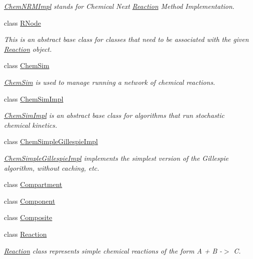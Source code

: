 \begin{DoxyCompactItemize}
\begin{DoxyCompactList}\small\item\em \hyperlink{classchem_1_1ChemNRMImpl}{Chem\-N\-R\-M\-Impl} stands for Chemical Next \hyperlink{classchem_1_1Reaction}{Reaction} Method Implementation. \end{DoxyCompactList}\item 
class \hyperlink{classchem_1_1RNode}{R\-Node}
\begin{DoxyCompactList}\small\item\em This is an abstract base class for classes that need to be associated with the given \hyperlink{classchem_1_1Reaction}{Reaction} object. \end{DoxyCompactList}\item 
class \hyperlink{classchem_1_1ChemSim}{Chem\-Sim}
\begin{DoxyCompactList}\small\item\em \hyperlink{classchem_1_1ChemSim}{Chem\-Sim} is used to manage running a network of chemical reactions. \end{DoxyCompactList}\item 
class \hyperlink{classchem_1_1ChemSimImpl}{Chem\-Sim\-Impl}
\begin{DoxyCompactList}\small\item\em \hyperlink{classchem_1_1ChemSimImpl}{Chem\-Sim\-Impl} is an abstract base class for algorithms that run stochastic chemical kinetics. \end{DoxyCompactList}\item 
class \hyperlink{classchem_1_1ChemSimpleGillespieImpl}{Chem\-Simple\-Gillespie\-Impl}
\begin{DoxyCompactList}\small\item\em \hyperlink{classchem_1_1ChemSimpleGillespieImpl}{Chem\-Simple\-Gillespie\-Impl} implements the simplest version of the Gillespie algorithm, without caching, etc. \end{DoxyCompactList}\item 
class \hyperlink{classchem_1_1Compartment}{Compartment}
\item 
class \hyperlink{classchem_1_1Component}{Component}
\item 
class \hyperlink{classchem_1_1Composite}{Composite}
\item 
class \hyperlink{classchem_1_1Reaction}{Reaction}
\begin{DoxyCompactList}\small\item\em \hyperlink{classchem_1_1Reaction}{Reaction} class represents simple chemical reactions of the form A + B -\/$>$ C. \end{DoxyCompactList}\item 

\end{DoxyCompactItemize}

